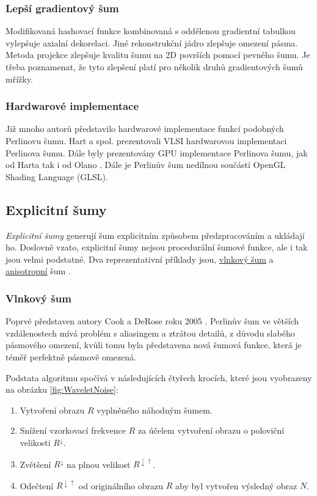 \subsubsection{Lepší gradientový šum}
Modifikovaná hashovací funkce kombinovaná s oddělenou gradientní tabulkou vylepšuje axialní dekorelaci. Jiné rekonstrukční jádro zlepšuje omezení pásma. Metoda projekce zlepšuje kvalitu šumu na 2D površích pomocí pevného šumu. Je třeba poznamenat, že tyto zlepšení platí pro několik druhů gradientových šumů mřížky. \cite{Kensler2008}

\subsubsection{Hardwarové implementace}
Již mnoho autorů představilo hardwarové implementace funkcí podobných Perlinovu šumu. Hart a spol. \cite{hart1999antialiased} prezentovali VLSI hardwarovou implementaci Perlinova šumu. Dále byly prezentovány GPU implementace Perlinova šumu, jak od Harta \cite{hart01} tak i od Olano \cite{ola05}. Dále je Perlinův šum nedílnou součástí OpenGL Shading Language (GLSL).

\subsection{Explicitní šumy}
\label{ExplicitNoises}
\textit{Explicitní šumy} generují šum explicitním způsobem předzpracováním a ukládají ho. Doslovně vzato, explicitní šumy nejsou procedurální šumové funkce, ale i tak jsou velmi podstatné. Dva reprezentativní příklady jsou, \hyperref[WaveletNoise]{vlnkový šum} a \hyperref[AnisotropNoise]{anisotropní} šum \cite{Lagae10}.

\subsubsection{Vlnkový šum}
\label{WaveletNoise}
Poprvé představen autory Cook a DeRose roku 2005 \cite{Cook05}. Perlinův šum ve větších vzdálenostech mívá problém s aliasingem a ztrátou detailů, z důvodu slabého pásmového omezení, kvůli tomu byla představena nová šumová funkce, která je téměř perfektně pásmově omezená.

Podstata algoritmu spočívá v následujících čtyřech krocích, které jsou vyobrazeny na obrázku \ref{fig:WaveletNoise}:

\begin{enumerate}
	\item Vytvoření obrazu $R$ vyplněného náhodným šumem.
	\item Snížení vzorkovací frekvence $R$ za účelem vytvoření obrazu o poloviční velikosti $R^\downarrow$.
	\item Zvětšení $R^\downarrow$ na plnou velikost $R^{\downarrow\uparrow}$.
	\item Odečtení $R^{\downarrow\uparrow}$ od originálního obrazu $R$ aby byl vytvořen výsledný obraz $N$.
\end{enumerate}

